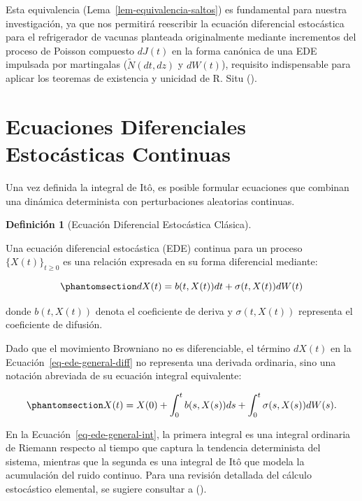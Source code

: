 \documentclass[
  spanish,
  letterpaper,
  DIV=11,
  numbers=noendperiod]{scrreprt}
\theoremstyle{plain}
\theoremstyle{plain}
\theoremstyle{plain}
\theoremstyle{definition}
\newtheorem{definition}{Definición}[chapter]
\theoremstyle{remark}
\begin{document}
Esta equivalencia (Lema~\ref{lem-equivalencia-saltos}) es fundamental
para nuestra investigación, ya que nos permitirá reescribir la ecuación
diferencial estocástica para el refrigerador de vacunas planteada
originalmente mediante incrementos del proceso de Poisson compuesto
\(dJ(t)\) en la forma canónica de una EDE impulsada por martingalas
(\(\tilde{N}(dt, dz)\) y \(dW(t)\)), requisito indispensable para
aplicar los teoremas de existencia y unicidad de R. Situ
().

\section{Ecuaciones Diferenciales Estocásticas
Continuas}\label{ecuaciones-diferenciales-estocuxe1sticas-continuas}

Una vez definida la integral de Itô, es posible formular ecuaciones que
combinan una dinámica determinista con perturbaciones aleatorias
continuas.

\begin{definition}[Ecuación Diferencial Estocástica
Clásica]\protect\hypertarget{def-ede-general}{}\label{def-ede-general}

Una ecuación diferencial estocástica (EDE) continua para un proceso
\(\{X(t)\}_{t \ge 0}\) es una relación expresada en su forma diferencial
mediante:

\begin{equation}\phantomsection\label{eq-ede-general-diff}{
dX(t) = b(t, X(t)) dt + \sigma(t, X(t)) dW(t)
}\end{equation}

donde \(b(t, X(t))\) denota el coeficiente de deriva y
\(\sigma(t, X(t))\) representa el coeficiente de difusión.

\end{definition}

Dado que el movimiento Browniano no es diferenciable, el término
\(dX(t)\) en la Ecuación~\ref{eq-ede-general-diff} no representa una
derivada ordinaria, sino una notación abreviada de su ecuación integral
equivalente:

\begin{equation}\phantomsection\label{eq-ede-general-int}{
X(t) = X(0) + \int_0^t b(s, X(s)) ds + \int_0^t \sigma(s, X(s)) dW(s).
}\end{equation}

En la Ecuación~\ref{eq-ede-general-int}, la primera integral es una
integral ordinaria de Riemann respecto al tiempo que captura la
tendencia determinista del sistema, mientras que la segunda es una
integral de Itô que modela la acumulación del ruido continuo. Para una
revisión detallada del cálculo estocástico elemental, se sugiere
consultar a ().
\end{document}
